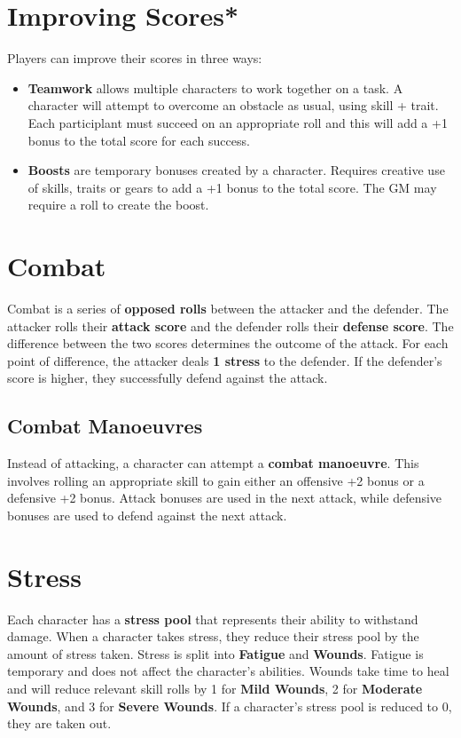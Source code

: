 \documentclass[nodeprecatedcode,bg=print]{dndbook}
\begin{document}
\begin{paracol}{2}
    \section*{Improving Scores*}
    Players can improve their scores in three ways:
    \begin{itemize}
        \item \textbf{Teamwork} allows multiple characters to work together on a task. A character will attempt to overcome an obstacle as usual, using skill + trait. Each participlant must succeed on an appropriate roll and this will add a +1 bonus to the total score for each success.
        \item \textbf{Boosts} are temporary bonuses created by a character. Requires creative use of skills, traits or gears to add a +1 bonus to the total score. The GM may require a roll to create the boost.
    \end{itemize}

    \switchcolumn

    \section*{Combat}
    Combat is a series of \textbf{opposed rolls} between the attacker and the defender. The attacker rolls their \textbf{attack score} and the defender rolls their \textbf{defense score}. The difference between the two scores determines the outcome of the attack. For each point of difference, the attacker deals \textbf{1 stress} to the defender. If the defender's score is higher, they successfully defend against the attack.

    \subsection{Combat Manoeuvres}
    Instead of attacking, a character can attempt a \textbf{combat manoeuvre}. This involves rolling an appropriate skill to gain either an offensive +2 bonus or a defensive +2 bonus. Attack bonuses are used in the next attack, while defensive bonuses are used to defend against the next attack.

    \section*{Stress}
    Each character has a \textbf{stress pool} that represents their ability to withstand damage. When a character takes stress, they reduce their stress pool by the amount of stress taken. Stress is split into \textbf{Fatigue} and \textbf{Wounds}. Fatigue is temporary and does not affect the character's abilities. Wounds take time to heal and will reduce relevant skill rolls by 1 for \textbf{Mild Wounds}, 2 for \textbf{Moderate Wounds}, and 3 for \textbf{Severe Wounds}. If a character's stress pool is reduced to 0, they are taken out.


\end{paracol}
\end{document}
